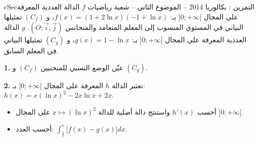 \documentclass[12pt,a4paper]{article}
\newenvironment{BOX}[2]{\begin{otherlanguage}{english}\begin{arbox}{#1}{#2}}{\end{arbox}\end{otherlanguage}}
\newcounter{exo}
\newenvironment{tamrin}[1]{\stepcounter{exo}\begin{BOX}{cSec}{التمرين \theexo: #1}}{\end{BOX}}
\newenvironment{sq}{\begin{itemize}[leftmargin=2.4em,itemsep=3pt]}{\end{itemize}}
\newcommand{\qa}{\item[(أ)]}\newcommand{\qb}{\item[(ب)]}\newcommand{\qc}{\item[(جـ)]}\newcommand{\qd}{\item[(د)]}\newcommand{\qe}{\item[(هـ)]}
\newcommand{\QQ}[1]{\par\smallskip\textbf{#1.} }
\begin{document}
\begin{tamrin}{بكالوريا 2014 -- الموضوع الثاني -- شعبة رياضيات}
$f$ الدالة العددية المعرفة على المجال $]0;+\infty[$ بـ: $f(x)=(1+2\ln x)(-1+\ln x)$، و $(C_f)$ تمثيلها البياني في المستوي المنسوب إلى المعلم المتعامد والمتجانس $(O;\vec i,\vec j)$.
$g$ الدالة العددية المعرفة على المجال $]0;+\infty[$ بـ: $g(x)=1-\ln x$، و $(C_g)$ تمثيلها البياني في المعلم السابق.
\QQ{1} عيّن الوضع النسبي للمنحنيين $(C_f)$ و $(C_g)$.
\QQ{2} نعتبر الدالة $h$ المعرفة على المجال $]0;+\infty[$ بـ: $h(x)=x(\ln x)^2-2x\ln x+2x$.
\begin{sq}
\qa أحسب $h'(x)$ واستنتج دالة أصلية للدالة $x\mapsto(\ln x)^2$ على المجال $]0;+\infty[$.
\qb أحسب العدد: $\displaystyle\int_{\frac1e}^e\big[f(x)-g(x)\big]dx$.
\end{sq}
\end{tamrin}
\end{document}
